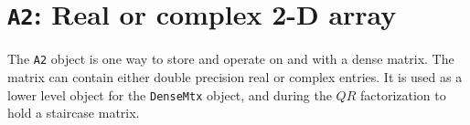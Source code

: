 \par
\chapter{{\tt A2}: Real or complex 2-D array}
\par
The {\tt A2} object is one way to store and operate on and
with a dense matrix. 
The matrix can contain either double precision real or complex
entries.
It is used as a lower level object for the {\tt DenseMtx} object,
and during the $QR$ factorization to hold a staircase matrix.
\par
